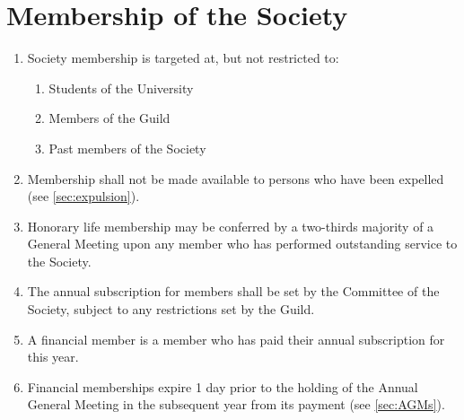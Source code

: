 \documentclass[a4paper]{article}
\newenvironment{enumsection}[1]{\section{#1} \begin{enumerate}[ref=\thesection.\theenumi]}{\end{enumerate}}
\begin{document}
\begin{enumsection}{Membership of the Society}
    \item Society membership is targeted at, but not restricted to:
    \begin{enumerate}
        \item Students of the University
        \item Members of the Guild
        \item Past members of the Society
    \end{enumerate}
    \item Membership shall not be made available to persons who have been expelled (see \cref{sec:expulsion}).
    \item Honorary life membership may be conferred by a two-thirds majority of a General Meeting upon any member who has performed outstanding service to the Society.
    \item The annual subscription for members shall be set by the Committee of the Society, subject to any restrictions set by the Guild.
    \item A financial member is a member who has paid their annual subscription for this year.
    \item Financial memberships expire 1 day prior to the holding of the Annual General Meeting in the subsequent year from its payment (see \cref{sec:AGMs}).
\end{enumsection}
\end{document}
